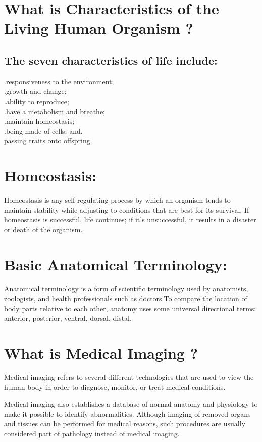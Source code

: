 \documentclass[12pt]{article}
\begin{document}
\section{ What is Characteristics of the Living Human Organism ?}
\subsection{The seven characteristics of life include:}
 .responsiveness to the environment;\\
.growth and change;\\
.ability to reproduce;\\
.have a metabolism and breathe;\\
.maintain homeostasis;\\
.being made of cells; and.\\
passing traits onto offspring.

\section{ Homeostasis: } 
Homeostasis is any self-regulating process by which an organism tends to maintain stability while adjusting to conditions that are best for its survival. If homeostasis is successful, life continues; if it's unsuccessful, it results in a disaster or death of the organism.
\section{ Basic Anatomical Terminology:}
Anatomical terminology is a form of scientific terminology used by anatomists, zoologists, and health professionals such as doctors.To compare the location of body parts relative to each other, anatomy uses some universal directional terms: anterior, posterior, ventral, dorsal, distal.
\section{ What is  Medical Imaging ?}
Medical imaging refers to several different technologies that are used to view the human body in order to diagnose, monitor, or treat medical conditions.

 Medical imaging also establishes a database of normal anatomy and physiology to make it possible to identify abnormalities. Although imaging of removed organs and tissues can be performed for medical reasons, such procedures are usually considered part of pathology instead of medical imaging.
\end{document}
